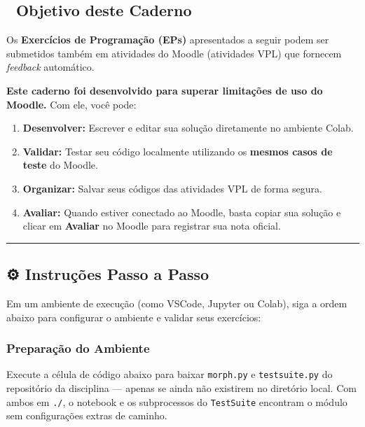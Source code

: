 \documentclass[
  portuguese,
  letterpaper,
  openany,
  oneside,
  12pt,
  a4paper]{book}
\providecommand{\tightlist}{%
  \setlength{\itemsep}{0pt}\setlength{\parskip}{0pt}}
\begin{document}
\subsection*{🎯 Objetivo deste Caderno}\label{objetivo-deste-caderno}

Os \textbf{Exercícios de Programação (EPs)} apresentados a seguir podem
ser submetidos também em atividades do Moodle (atividades VPL) que
fornecem \emph{feedback} automático.

\textbf{Este caderno foi desenvolvido para superar limitações de uso do
Moodle.} Com ele, você pode:

\begin{enumerate}
\def\labelenumi{\arabic{enumi}.}
\tightlist
\item
  \textbf{Desenvolver:} Escrever e editar sua solução diretamente no
  ambiente Colab.
\item
  \textbf{Validar:} Testar seu código localmente utilizando os
  \textbf{mesmos casos de teste} do Moodle.
\item
  \textbf{Organizar:} Salvar seus códigos das atividades VPL de forma
  segura.
\item
  \textbf{Avaliar:} Quando estiver conectado ao Moodle, basta copiar sua
  solução e clicar em \textbf{Avaliar} no Moodle para registrar sua nota
  oficial.
\end{enumerate}

\begin{center}\rule{0.5\linewidth}{0.5pt}\end{center}

\subsection*{⚙️ Instruções Passo a
Passo}\label{instruuxe7uxf5es-passo-a-passo}

Em um ambiente de execução (como VSCode, Jupyter ou Colab), siga a ordem
abaixo para configurar o ambiente e validar seus exercícios:

\subsubsection*{Preparação do
Ambiente}\label{preparauxe7uxe3o-do-ambiente}

Execute a célula de código abaixo para baixar \texttt{morph.py} e
\texttt{testsuite.py} do repositório da disciplina --- apenas se ainda
não existirem no diretório local. Com ambos em \texttt{./}, o notebook e
os subprocessos do \texttt{TestSuite} encontram o módulo sem
configurações extras de caminho.
\end{document}
